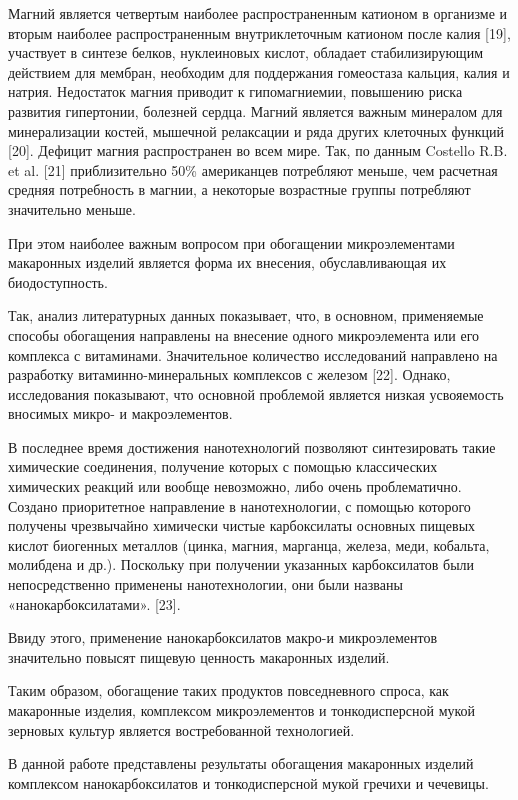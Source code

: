 \begin{multicols}{2}
Магний является четвертым наиболее распространенным катионом в организме
и вторым наиболее распространенным внутриклеточным катионом после калия
{[}19{]}, участвует в синтезе белков, нуклеиновых кислот, обладает
стабилизирующим действием для мембран, необходим для поддержания
гомеостаза кальция, калия и натрия. Недостаток магния приводит к
гипомагниемии, повышению риска развития гипертонии, болезней сердца.
Магний является важным минералом для минерализации костей, мышечной
релаксации и ряда других клеточных функций {[}20{]}. Дефицит магния
распространен во всем мире. Так, по данным Costello R.B. et al. {[}21{]}
приблизительно 50\% американцев потребляют меньше, чем расчетная средняя
потребность в магнии, а некоторые возрастные группы потребляют
значительно меньше.

При этом наиболее важным вопросом при обогащении микроэлементами
макаронных изделий является форма их внесения, обуславливающая их
биодоступность.

Так, анализ литературных данных показывает, что, в основном, применяемые
способы обогащения направлены на внесение одного микроэлемента или его
комплекса с витаминами. Значительное количество исследований направлено
на разработку витаминно-минеральных комплексов с железом {[}22{]}.
Однако, исследования показывают, что основной проблемой является низкая
усвояемость вносимых микро- и макроэлементов.

В последнее время достижения нанотехнологий позволяют синтезировать
такие химические соединения, получение которых с помощью классических
химических реакций или вообще невозможно, либо очень проблематично.
Создано приоритетное направление в нанотехнологии, с помощью которого
получены чрезвычайно химически чистые карбоксилаты основных пищевых
кислот биогенных металлов (цинка, магния, марганца, железа, меди,
кобальта, молибдена и др.). Поскольку при получении указанных
карбоксилатов были непосредственно применены нанотехнологии, они были
названы «нанокарбоксилатами». {[}23{]}.

Ввиду этого, применение нанокарбоксилатов макро-и микроэлементов
значительно повысят пищевую ценность макаронных изделий.

Таким образом, обогащение таких продуктов повседневного спроса, как
макаронные изделия, комплексом микроэлементов и тонкодисперсной мукой
зерновых культур является востребованной технологией.

В данной работе представлены результаты обогащения макаронных изделий
комплексом нанокарбоксилатов и тонкодисперсной мукой гречихи и чечевицы.


\end{multicols}

